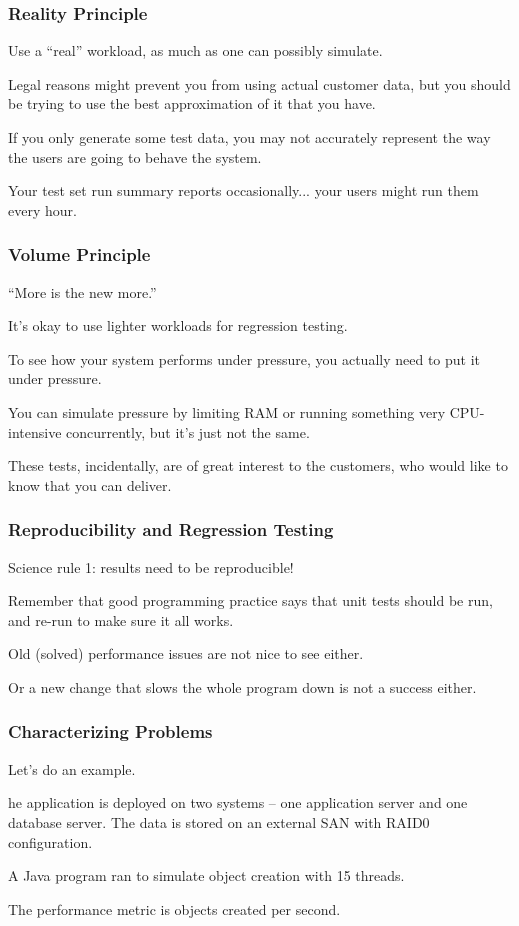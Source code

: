 \begin{frame}
\frametitle{Reality Principle}
Use a ``real'' workload, as much as one can possibly simulate. 

Legal reasons might prevent you from using actual customer data, but you should be trying to use the best approximation of it that you have. 

If you only generate some test data, you may not accurately represent the way the users are going to behave the system. 

Your test set run summary reports occasionally... your users might run them every hour. 

\end{frame}



\begin{frame}
\frametitle{Volume Principle}
``More is the new more.'' 

It's okay to use lighter workloads for regression testing. 

To see how your system performs under pressure, you actually need to put it under pressure. 

You can simulate pressure by limiting RAM or running something very CPU-intensive concurrently, but it's just not the same.

These tests, incidentally, are of great interest to the customers, who would like to know that you can deliver. 


\end{frame}



\begin{frame}
\frametitle{Reproducibility and Regression Testing}

Science rule 1: results need to be reproducible!

Remember that good programming practice says that unit tests should be run, and re-run to make sure it all works. 

Old (solved) performance issues are not nice to see either. 

Or a new change that slows the whole program down is not a success either.

\end{frame}



\begin{frame}
\frametitle{Characterizing Problems}

Let's do an example. 

he application is deployed on two systems -- one application server and one database server. The data is stored on an external SAN with RAID0 configuration. 

A Java program ran to simulate object creation with 15 threads. 

The performance metric is objects created per second. 


\end{frame}



